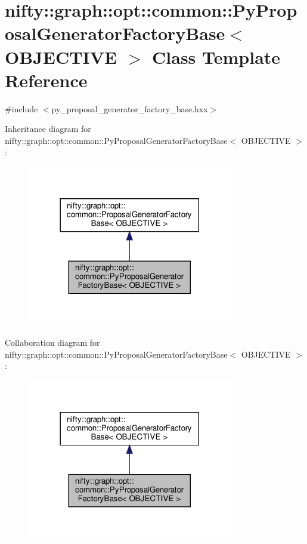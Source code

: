 \hypertarget{classnifty_1_1graph_1_1opt_1_1common_1_1PyProposalGeneratorFactoryBase}{}\section{nifty\+:\+:graph\+:\+:opt\+:\+:common\+:\+:Py\+Proposal\+Generator\+Factory\+Base$<$ O\+B\+J\+E\+C\+T\+I\+VE $>$ Class Template Reference}
\label{classnifty_1_1graph_1_1opt_1_1common_1_1PyProposalGeneratorFactoryBase}


{\ttfamily \#include $<$py\+\_\+proposal\+\_\+generator\+\_\+factory\+\_\+base.\+hxx$>$}



Inheritance diagram for nifty\+:\+:graph\+:\+:opt\+:\+:common\+:\+:Py\+Proposal\+Generator\+Factory\+Base$<$ O\+B\+J\+E\+C\+T\+I\+VE $>$\+:
\nopagebreak
\begin{figure}[H]
\begin{center}
\leavevmode
\includegraphics[width=254pt]{classnifty_1_1graph_1_1opt_1_1common_1_1PyProposalGeneratorFactoryBase__inherit__graph}
\end{center}
\end{figure}


Collaboration diagram for nifty\+:\+:graph\+:\+:opt\+:\+:common\+:\+:Py\+Proposal\+Generator\+Factory\+Base$<$ O\+B\+J\+E\+C\+T\+I\+VE $>$\+:
\nopagebreak
\begin{figure}[H]
\begin{center}
\leavevmode
\includegraphics[width=254pt]{classnifty_1_1graph_1_1opt_1_1common_1_1PyProposalGeneratorFactoryBase__coll__graph}
\end{center}
\end{figure}
